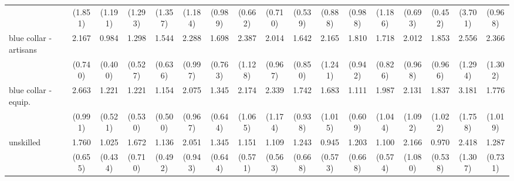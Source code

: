{\begin{tabular}{l*{16}{c}}
                    &     (1.851)         &     (1.191)         &     (1.293)         &     (1.357)         &     (1.184)         &     (0.989)         &     (0.662)         &     (0.710)         &     (0.539)         &     (0.888)         &     (0.988)         &     (1.186)         &     (0.693)         &     (0.452)         &     (3.701)         &     (0.968)         \\
[1em]
blue collar - artisans&       2.167\sym{*}  &       0.984         &       1.298         &       1.544         &       2.288         &       1.698         &       2.387         &       2.014         &       1.642         &       2.165         &       1.810         &       1.718         &       2.012         &       1.853         &       2.556         &       2.366         \\
                    &     (0.740)         &     (0.400)         &     (0.527)         &     (0.636)         &     (0.997)         &     (0.763)         &     (1.128)         &     (0.967)         &     (0.850)         &     (1.241)         &     (0.942)         &     (0.826)         &     (0.968)         &     (0.966)         &     (1.294)         &     (1.302)         \\
[1em]
blue collar - equip.&       2.663\sym{**} &       1.221         &       1.221         &       1.154         &       2.075         &       1.345         &       2.174         &       2.339         &       1.742         &       1.683         &       1.111         &       1.987         &       2.131         &       1.837         &       3.181\sym{*}  &       1.776         \\
                    &     (0.991)         &     (0.521)         &     (0.530)         &     (0.500)         &     (0.967)         &     (0.644)         &     (1.065)         &     (1.174)         &     (0.938)         &     (1.015)         &     (0.609)         &     (1.044)         &     (1.092)         &     (1.022)         &     (1.758)         &     (1.019)         \\
[1em]
unskilled           &       1.760         &       1.025         &       1.672         &       1.136         &       2.051         &       1.345         &       1.151         &       1.109         &       1.243         &       0.945         &       1.203         &       1.100         &       2.166         &       0.970         &       2.418         &       1.287         \\
                    &     (0.655)         &     (0.434)         &     (0.710)         &     (0.492)         &     (0.943)         &     (0.644)         &     (0.571)         &     (0.563)         &     (0.668)         &     (0.573)         &     (0.668)         &     (0.574)         &     (1.080)         &     (0.538)         &     (1.307)         &     (0.731)         \\

\end{tabular}}
